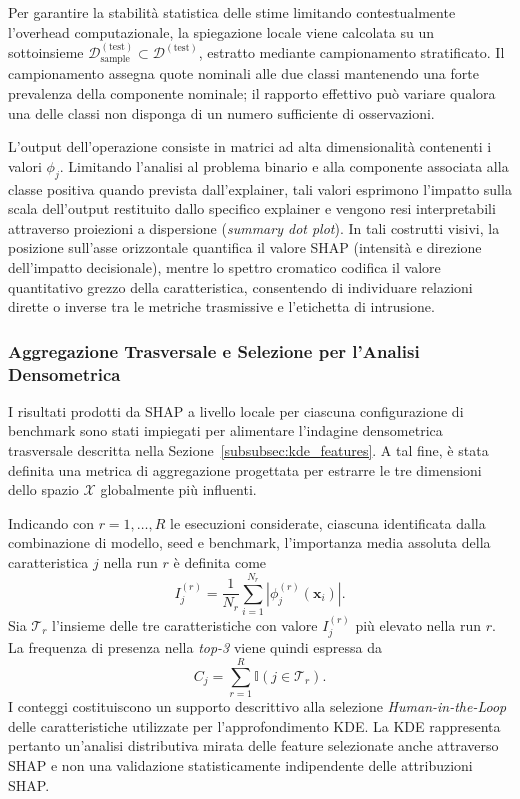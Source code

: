 Per garantire la stabilità statistica delle stime limitando contestualmente l'overhead computazionale, la spiegazione locale viene calcolata su un sottoinsieme $\mathcal{D}_{\text{sample}}^{(\text{test})} \subset \mathcal{D}^{(\text{test})}$, estratto mediante campionamento stratificato. Il campionamento assegna quote nominali alle due classi mantenendo una forte prevalenza della componente nominale; il rapporto effettivo può variare qualora una delle classi non disponga di un numero sufficiente di osservazioni.
        
L'output dell'operazione consiste in matrici ad alta dimensionalità contenenti i valori $\phi_j$. Limitando l'analisi al problema binario e alla componente associata alla classe positiva quando prevista dall'explainer, tali valori esprimono l'impatto sulla scala dell'output restituito dallo specifico explainer e vengono resi interpretabili attraverso proiezioni a dispersione (\textit{summary dot plot}). In tali costrutti visivi, la posizione sull'asse orizzontale quantifica il valore SHAP (intensità e direzione dell'impatto decisionale), mentre lo spettro cromatico codifica il valore quantitativo grezzo della caratteristica, consentendo di individuare relazioni dirette o inverse tra le metriche trasmissive e l'etichetta di intrusione.

\subsubsection{Aggregazione Trasversale e Selezione per l'Analisi Densometrica}
\label{subsubsec:aggregazione_shap_kde}

I risultati prodotti da SHAP a livello locale per ciascuna configurazione di benchmark sono stati impiegati per alimentare l'indagine densometrica trasversale descritta nella Sezione~\ref{subsubsec:kde_features}. A tal fine, è stata definita una metrica di aggregazione progettata per estrarre le tre dimensioni dello spazio $\mathcal{X}$ globalmente più influenti.

Indicando con $r=1,\ldots,R$ le esecuzioni considerate, ciascuna identificata dalla combinazione di modello, seed e benchmark, l'importanza media assoluta della caratteristica $j$ nella run $r$ è definita come
\begin{equation}
    I_j^{(r)}=\frac{1}{N_r}\sum_{i=1}^{N_r}\left|\phi_j^{(r)}(\mathbf{x}_i)\right|.
\end{equation}
Sia $\mathcal{T}_r$ l'insieme delle tre caratteristiche con valore $I_j^{(r)}$ più elevato nella run $r$. La frequenza di presenza nella \textit{top-3} viene quindi espressa da
\begin{equation}
    C_j=\sum_{r=1}^{R}\mathbb{I}(j\in\mathcal{T}_r).
\end{equation}
I conteggi costituiscono un supporto descrittivo alla selezione \textit{Human-in-the-Loop} delle caratteristiche utilizzate per l'approfondimento KDE. La KDE rappresenta pertanto un'analisi distributiva mirata delle feature selezionate anche attraverso SHAP e non una validazione statisticamente indipendente delle attribuzioni SHAP.

